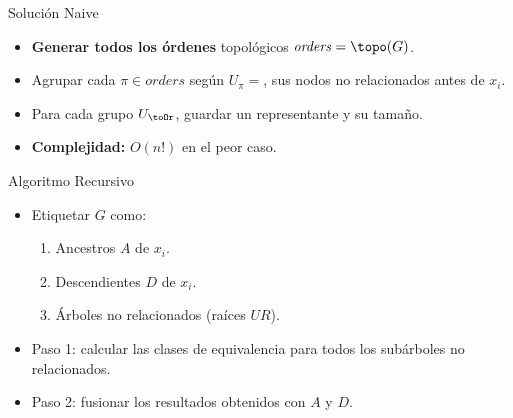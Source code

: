 \begin{frame}{Solución Naive}
	\begin{itemize}[<+- | alert@+>]
		\item \textbf{Generar todos los órdenes} topológicos $\mathit{orders}=\topo(G)$.
		\item Agrupar cada $\pi\in\mathit{orders}$ según 
		$U_\pi=$, sus nodos no relacionados antes de $x_i$.
		\item Para cada grupo $U_\toOr$, guardar un representante y su tamaño.
		\item \textbf{Complejidad:} $O(n!)$ en el peor caso.
	\end{itemize}
\end{frame}
	
	\begin{frame}{Algoritmo Recursivo}
		\begin{itemize}[<+- | alert@+>]
			\item Etiquetar $G$ como:
			\begin{enumerate}
				\item Ancestros $A$ de $x_i$.
				\item Descendientes $D$ de $x_i$.
				\item Árboles no relacionados (raíces $UR$).
			\end{enumerate}
			\item Paso 1: calcular las clases de equivalencia para todos los subárboles no relacionados.
			\item Paso 2: fusionar los resultados obtenidos con $A$ y $D$.
		\end{itemize}
	\end{frame}
	
